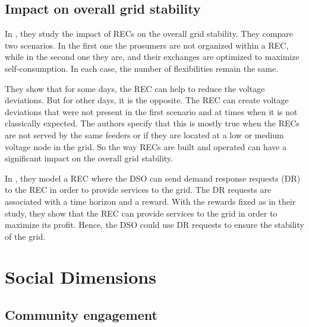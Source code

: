 \documentclass[12pt,a4paper]{article}
\begin{document}
\subsection{Impact on overall grid stability}
In \cite{article_10}, they study the impact of RECs on the overall grid stability. They compare two scenarios. In the first one the prosumers are not organized within a REC, while in the second one they are, and their exchanges are optimized to maximize self-consumption. In each case, the number of flexibilities remain the same.

They show that for some days, the REC can help to reduce the voltage deviations. But for other days, it is the opposite. The REC can create voltage deviations that were not present in the first scenario and at times when it is not classically expected. The authors specify that this is mostly true when the RECs are not served by the same feeders or if they are located at a low or medium voltage node in the grid. So the way RECs are built and operated can have a significant impact on the overall grid stability.

In \cite{article_7}, they model a REC where the DSO can send demand response requests (DR) to the REC in order to provide services to the grid. The DR requests are associated with a time horizon and a reward. With the rewards fixed as in their study, they show that the REC can provide services to the grid in order to maximize its profit. Hence, the DSO could use DR requests to ensure the stability of the grid.

\section{Social Dimensions}
\subsection{Community engagement}
\end{document}
